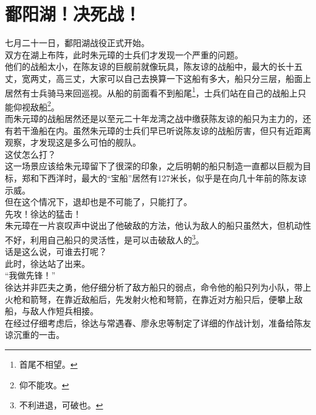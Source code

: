 \section{鄱阳湖！决死战！}
\ifnum{}
	\begin{multicols}{\theparacolNo}
\fi
七月二十一日，鄱阳湖战役正式开始。\\

双方在湖上布阵，此时朱元璋的士兵们才发现一个严重的问题。\\

他们的战船太小，在陈友谅的巨舰前就像玩具，陈友谅的战船中，最大的长十五丈，宽两丈，高三丈，大家可以自己去换算一下这船有多大，船只分三层，船面上居然有士兵骑马来回巡视。从船的前面看不到船尾\footnote{首尾不相望。}，士兵们站在自己的战船上只能仰视敌船\footnote{仰不能攻。}。\\

而朱元璋的战船居然还是以至元二十年龙湾之战中缴获陈友谅的船只为主力的，还有若干渔船在内。虽然朱元璋的士兵们早已听说陈友谅的战船厉害，但只有近距离观察，才发现这是多么可怕的舰队。\\

这仗怎么打？\\

这一场景应该给朱元璋留下了很深的印象，之后明朝的船只制造一直都以巨舰为目标，郑和下西洋时，最大的“宝船”居然有127米长，似乎是在向几十年前的陈友谅示威。\\

但在这个情况下，退却也是不可能了，只能打了。\\

先攻！徐达的猛击！\\

朱元璋在一片哀叹声中说出了他破敌的方法，他认为敌人的船只虽然大，但机动性不好，利用自己船只的灵活性，是可以击破敌人的\footnote{不利进退，可破也。}。\\

话是这么说，可谁去打呢？\\

此时，徐达站了出来。\\

“我做先锋！”\\

徐达并非匹夫之勇，他仔细分析了敌方船只的弱点，命令他的船只列为小队，带上火枪和箭弩，在靠近敌船后，先发射火枪和弩箭，在靠近对方船只后，便攀上敌船，与敌人作短兵相接。\\

在经过仔细考虑后，徐达与常遇春、廖永忠等制定了详细的作战计划，准备给陈友谅沉重的一击。\\


\end{multicols}

